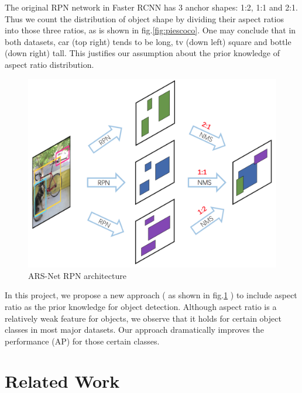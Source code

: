 \documentclass[10pt,twocolumn,letterpaper]{article}
\begin{document}



The original RPN network in Faster RCNN \cite{fasterRCNN} has 3 anchor shapes: 1:2, 1:1 and 2:1. Thus we count the distribution of object shape by dividing their aspect ratios into those three ratios, as is shown in fig.\ref{fig:piescoco}. One may conclude that in both datasets, car (top right) tends to be long, tv (down left) square and bottle (down right) tall. This justifies our assumption about the prior knowledge of aspect ratio distribution.

\begin{figure}[h]
\centering
\includegraphics[width=1\linewidth]{pic/ARS-archi-abstract.png}
\caption{ARS-Net RPN architecture}
\label{fig:ARS-archi}
\end{figure}

\par
In this project, we propose a new approach ( as shown in fig.\ref{fig:ARS-archi} ) to include aspect ratio as the prior knowledge for object detection. Although aspect ratio is a relatively weak feature for objects, we observe that it holds for certain object classes in most major datasets. Our approach dramatically improves the performance (AP) for those certain classes.

\section{Related Work}
    \label{sec:related-work}
\end{document}
